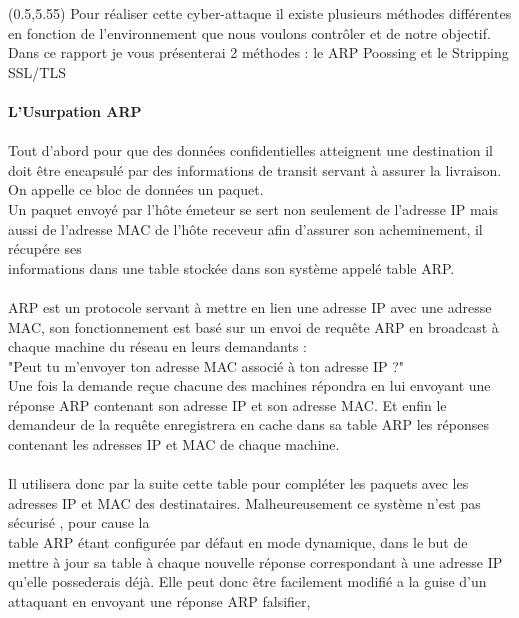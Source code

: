 \documentclass[landscape,12pt]{report}
\begin{document}
  \begin{textblock}{5.3}(0.5,5.55)
  \color{white}
  \normalsize
   Pour réaliser cette cyber-attaque il existe plusieurs méthodes différentes en fonction de l'environnement que nous voulons contrôler et de notre objectif. \\ Dans ce rapport je vous présenterai 2 méthodes : le \textcolor{blue!50}{ARP Poossing} et le \textcolor{blue!50}{Stripping SSL/TLS}
   \\
   \\
   \textbf{\large L'Usurpation \textcolor{blue!50}{ARP}}
   \\
   \\
   \normalsize
    Tout d'abord pour que des données confidentielles atteignent une destination il doit être encapsulé par des informations de transit servant à assurer la livraison. On appelle ce bloc de données un 
    \textcolor{blue!50} {paquet}.
    \\  
    Un paquet envoyé par l'hôte émeteur se sert non seulement de 
    \textcolor{blue!50}{l'adresse IP} 
    mais aussi de l'adresse 
    \textcolor{blue!50}{MAC} 
    de l'hôte receveur afin d'assurer son acheminement, il récupére ses \\ informations dans une table stockée dans son système appelé 
    \color{blue!50}table ARP.\\
    \color{white}
    \\
    ARP est un protocole servant à mettre en lien une adresse IP avec une adresse MAC, son fonctionnement est basé sur un envoi de \textcolor{blue!50}{requête ARP} 
    en broadcast à chaque machine du réseau en leurs demandants :\\ \textcolor{green!50}{"Peut tu m'envoyer ton adresse MAC associé à ton adresse IP ?"}\\ 
    Une fois la demande reçue chacune des machines répondra en lui envoyant une \textcolor{blue!50}{réponse ARP}
    contenant son adresse IP et son adresse MAC. Et enfin le demandeur de la requête enregistrera en cache dans sa table ARP les réponses contenant les adresses IP et MAC de chaque machine. \\
    \\
    Il utilisera donc par la suite cette table pour compléter les paquets avec les adresses IP et MAC des destinataires. Malheureusement ce système n'est pas 
    \textcolor{blue!50}{sécurisé}
    , pour cause la \\table ARP étant configurée par défaut en mode 
    \textcolor{blue!50}{dynamique}, 
    dans le but de mettre à jour sa table à chaque nouvelle réponse  correspondant à une adresse IP qu'elle possederais déjà. Elle peut donc être facilement modifié a la guise d'un attaquant en envoyant une réponse ARP \textcolor{blue!50}{falsifier},

\end{textblock}
\end{document}
